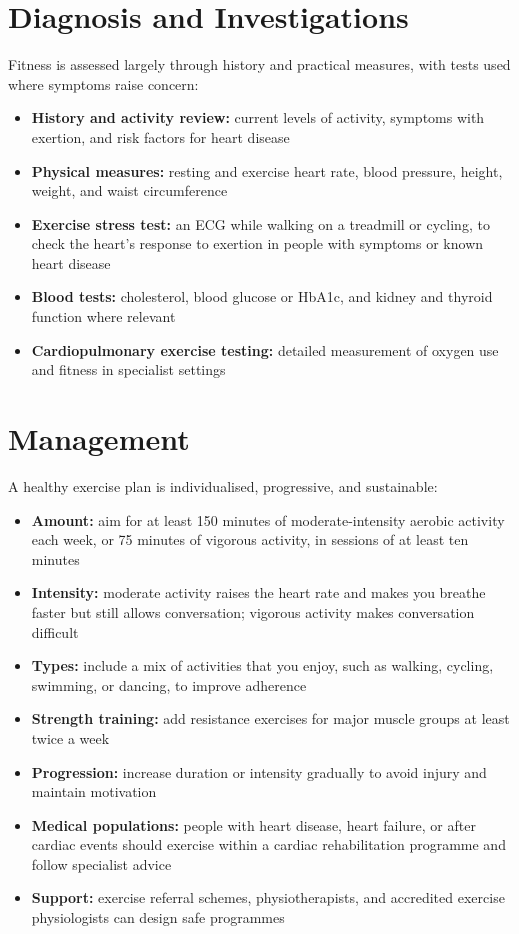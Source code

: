 \section*{Diagnosis and Investigations}
Fitness is assessed largely through history and practical measures, with tests used where symptoms raise concern:
\begin{itemize}
    \item \textbf{History and activity review:} current levels of activity, symptoms with exertion, and risk factors for heart disease
    \item \textbf{Physical measures:} resting and exercise heart rate, blood pressure, height, weight, and waist circumference
    \item \textbf{Exercise stress test:} an ECG while walking on a treadmill or cycling, to check the heart's response to exertion in people with symptoms or known heart disease
    \item \textbf{Blood tests:} cholesterol, blood glucose or HbA1c, and kidney and thyroid function where relevant
    \item \textbf{Cardiopulmonary exercise testing:} detailed measurement of oxygen use and fitness in specialist settings
\end{itemize}

\section*{Management}
A healthy exercise plan is individualised, progressive, and sustainable:
\begin{itemize}
    \item \textbf{Amount:} aim for at least 150 minutes of moderate-intensity aerobic activity each week, or 75 minutes of vigorous activity, in sessions of at least ten minutes
    \item \textbf{Intensity:} moderate activity raises the heart rate and makes you breathe faster but still allows conversation; vigorous activity makes conversation difficult
    \item \textbf{Types:} include a mix of activities that you enjoy, such as walking, cycling, swimming, or dancing, to improve adherence
    \item \textbf{Strength training:} add resistance exercises for major muscle groups at least twice a week
    \item \textbf{Progression:} increase duration or intensity gradually to avoid injury and maintain motivation
    \item \textbf{Medical populations:} people with heart disease, heart failure, or after cardiac events should exercise within a cardiac rehabilitation programme and follow specialist advice
    \item \textbf{Support:} exercise referral schemes, physiotherapists, and accredited exercise physiologists can design safe programmes
\end{itemize}

